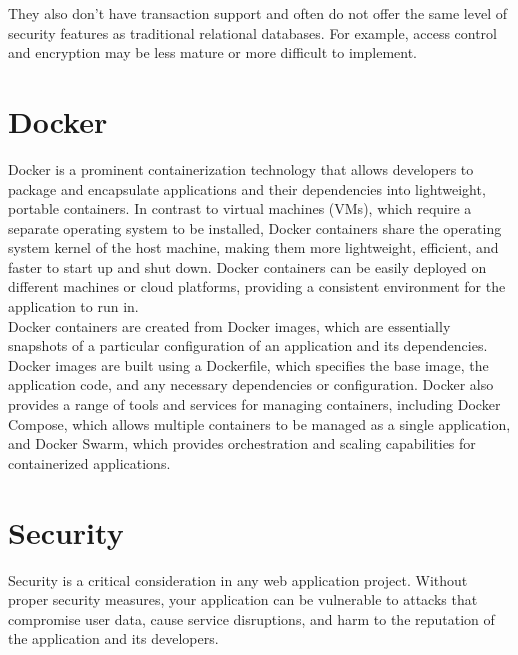 \noindent
They also don't have transaction support and often do not offer the same level of security features as traditional relational databases. For example, access control and encryption may be less mature or more difficult to implement. \cite{NoSQL_databases} \\

\section{Docker}

Docker is a prominent containerization technology that allows developers to package and encapsulate applications and their dependencies into lightweight, portable containers. In contrast to virtual machines (VMs), which require a separate operating system to be installed, Docker containers share the operating system kernel of the host machine, making them more lightweight, efficient, and faster to start up and shut down. \cite{Docker_containers, Docker_architecture} Docker containers can be easily deployed on different machines or cloud platforms, providing a consistent environment for the application to run in. \\

\noindent
Docker containers are created from Docker images, which are essentially snapshots of a particular configuration of an application and its dependencies. Docker images are built using a Dockerfile, which specifies the base image, the application code, and any necessary dependencies or configuration. Docker also provides a range of tools and services for managing containers, including Docker Compose, which allows multiple containers to be managed as a single application, and Docker Swarm, which provides orchestration and scaling capabilities for containerized applications.


\section{Security}

Security is a critical consideration in any web application project. Without proper security measures, your application can be vulnerable to attacks that compromise user data, cause service disruptions, and harm to the reputation of the application and its developers. 

